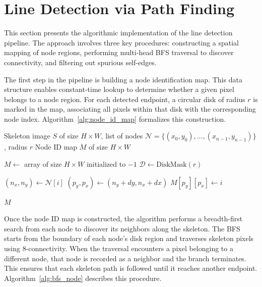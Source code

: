 \section{Line Detection via Path Finding}

This section presents the algorithmic implementation of the line detection pipeline. The approach involves three key procedures: constructing a spatial mapping of node regions, performing multi-head BFS traversal to discover connectivity, and filtering out spurious self-edges.

The first step in the pipeline is building a node identification map. This data structure enables constant-time lookup to determine whether a given pixel belongs to a node region. For each detected endpoint, a circular disk of radius $r$ is marked in the map, associating all pixels within that disk with the corresponding node index. Algorithm~\ref{alg:node_id_map} formalizes this construction.

\begin{algorithm}[H]
\caption{Build Node ID Map}
\label{alg:node_id_map}
\begin{algorithmic}[1]
\Require Skeleton image $S$ of size $H \times W$, list of nodes $\mathcal{N} = \{(x_0, y_0), \ldots, (x_{n-1}, y_{n-1})\}$, radius $r$
\Ensure Node ID map $M$ of size $H \times W$

\State $M \gets$ array of size $H \times W$ initialized to $-1$
\State $\mathcal{D} \gets \text{DiskMask}(r)$

    \State $(n_x, n_y) \gets \mathcal{N}[i]$
        \State $(p_y, p_x) \gets (n_y + dy, n_x + dx)$
            \State $M[p_y][p_x] \gets i$
        \EndIf
    \EndFor
\EndFor

\State \Return $M$
\end{algorithmic}
\end{algorithm}

Once the node ID map is constructed, the algorithm performs a breadth-first search from each node to discover its neighbors along the skeleton. The BFS starts from the boundary of each node's disk region and traverses skeleton pixels using 8-connectivity. When the traversal encounters a pixel belonging to a different node, that node is recorded as a neighbor and the branch terminates. This ensures that each skeleton path is followed until it reaches another endpoint. Algorithm~\ref{alg:bfs_node} describes this procedure.

